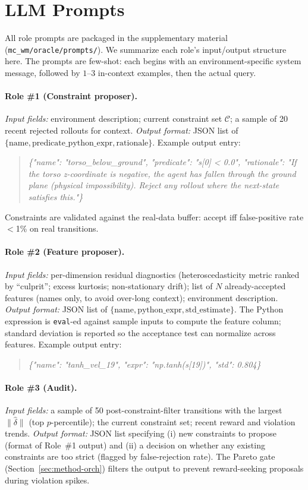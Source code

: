 \documentclass{article}
\theoremstyle{definition}
\begin{document}
\section{LLM Prompts}
\label{app:prompts}

All role prompts are packaged in the supplementary material
(\texttt{mc\_wm/oracle/prompts/}).  We summarize each role's
input/output structure here.  The prompts are few-shot: each begins
with an environment-specific system message, followed by $1$--$3$
in-context examples, then the actual query.

\paragraph{Role \#1 (Constraint proposer).}
\emph{Input fields:} environment description; current constraint set
$\mathcal C$; a sample of 20 recent rejected rollouts for context.
\emph{Output format:} JSON list of
$\{\text{name}, \text{predicate\_python\_expr}, \text{rationale}\}$.
Example output entry:
\begin{quote}\small\itshape
\{"name": "torso\_below\_ground", "predicate": "s[0] < 0.0",
"rationale": "If the torso z-coordinate is negative, the agent has
fallen through the ground plane (physical impossibility).  Reject any
rollout where the next-state satisfies this."\}
\end{quote}
Constraints are validated against the real-data buffer: accept iff
false-positive rate $<$1\% on real transitions.

\paragraph{Role \#2 (Feature proposer).}
\emph{Input fields:} per-dimension residual diagnostics
(heteroscedasticity metric ranked by ``culprit''; excess kurtosis;
non-stationary drift); list of $N$ already-accepted features (names only,
to avoid over-long context); environment description.
\emph{Output format:} JSON list of
$\{\text{name}, \text{python\_expr}, \text{std\_estimate}\}$.
The Python expression is \texttt{eval}-ed against sample inputs to
compute the feature column; standard deviation is reported so the
acceptance test can normalize across features.  Example output entry:
\begin{quote}\small\itshape
\{"name": "tanh\_vel\_19", "expr": "np.tanh(s[19])", "std": 0.804\}
\end{quote}

\paragraph{Role \#3 (Audit).}
\emph{Input fields:} a sample of 50 post-constraint-filter transitions
with the largest $\|\hat\delta\|$ (top $p$-percentile); the current
constraint set; recent reward and violation trends.
\emph{Output format:} JSON list specifying (i) new constraints to
propose (format of Role~\#1 output) and (ii) a decision on whether any
existing constraints are too strict (flagged by false-rejection rate).
The Pareto gate (Section~\ref{sec:method-orch}) filters the output to
prevent reward-seeking proposals during violation spikes.
\end{document}
